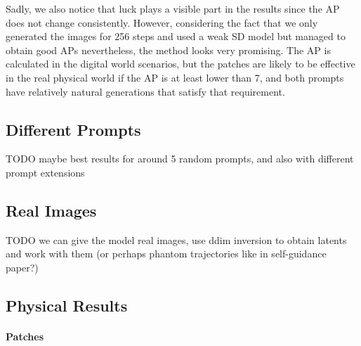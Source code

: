 Sadly, we also notice that luck plays a visible part in the results since the AP does not change consistently.
However, considering the fact that we only generated the images for 256 steps and used a weak SD model but managed to obtain good APs nevertheless, the method looks very promising.
The AP is calculated in the digital world scenarios, but the patches are likely to be effective in the real physical world if the AP is at least lower than 7, and both prompts have relatively natural generations that satisfy that requirement. 

\subsection{Different Prompts}

TODO maybe best results for around 5 random prompts, and also with different prompt extensions

\subsection{Real Images}

TODO we can give the model real images, use ddim inversion to obtain latents and work with them (or perhaps phantom trajectories like in self-guidance paper?)

\subsection{Physical Results}

\paragraph{Patches}

